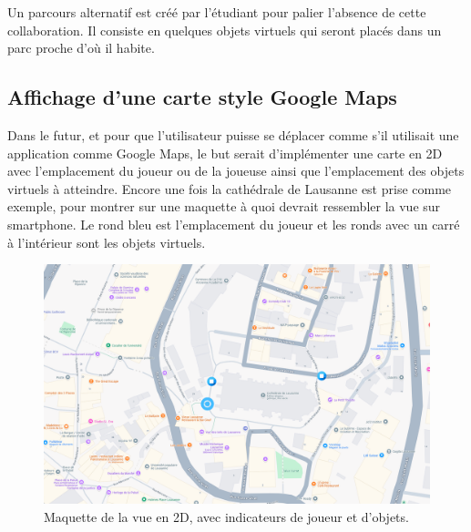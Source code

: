 Un parcours alternatif est créé par l'étudiant pour palier l'absence de
cette collaboration. Il consiste en quelques objets virtuels qui seront placés dans un parc proche d'où il habite.

\subsection{Affichage d'une carte style Google Maps}
Dans le futur, et pour que l'utilisateur puisse se déplacer comme s'il utilisait une application comme
Google Maps, le but serait d'implémenter une carte en 2D avec l'emplacement du joueur ou de la joueuse ainsi que l'emplacement
des objets virtuels à atteindre. Encore une fois la cathédrale de Lausanne est prise comme exemple, pour montrer sur une maquette à quoi
devrait ressembler la vue sur smartphone. Le rond bleu est l'emplacement du joueur et les ronds avec un carré à l'intérieur sont les objets
virtuels.

\begin{figure}[H]
    \centering
    \includegraphics[width=1\linewidth]{assets/figures/Screenshots/Maps.png}
    \caption{Maquette de la vue en 2D, avec indicateurs de joueur et d'objets.}
    \label{fig:Maps}
\end{figure}


